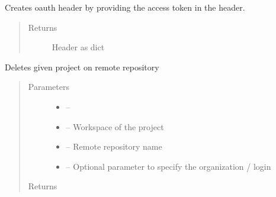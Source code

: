 \documentclass[letterpaper,10pt,english]{sphinxmanual}
\begin{document}

\begin{fulllineitems}
\label{_source/son_editor.impl:son_editor.impl.gitimpl.create_oauth_header}
Creates oauth header by providing the access token in the header.
\begin{quote}\begin{description}
\item[{Returns}] \leavevmode
Header as dict

\end{description}\end{quote}

\end{fulllineitems}


\begin{fulllineitems}
\label{_source/son_editor.impl:son_editor.impl.gitimpl.delete}
Deletes given project on remote repository
\begin{quote}\begin{description}
\item[{Parameters}] \leavevmode\begin{itemize}
\item {} 
 -- 

\item {} 
 -- Workspace of the project

\item {} 
 -- Remote repository name

\item {} 
 -- Optional parameter to specify the organization / login

\end{itemize}

\item[{Returns}] \leavevmode


\end{description}\end{quote}

\end{fulllineitems}
\end{document}
